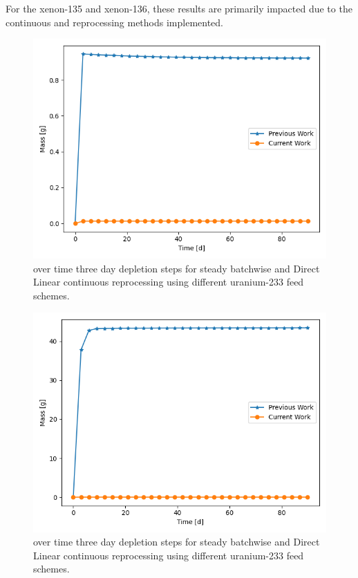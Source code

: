 For the xenon-135 and xenon-136, these results are primarily impacted due to the continuous and reprocessing methods implemented. 

\begin{figure}[H]
  \centering
  \includegraphics[scale=0.7]{images/prev-cur-xe135.png}
  \caption{ over time three day depletion steps for steady batchwise and Direct Linear continuous reprocessing using different uranium-233 feed schemes.}
   \label{fig:prev-cur-xe135-plot}
\end{figure}

\begin{figure}[H]
  \centering
  \includegraphics[scale=0.7]{images/prev-cur-xe136.png}
  \caption{ over time three day depletion steps for steady batchwise and Direct Linear continuous reprocessing using different uranium-233 feed schemes.}
   \label{fig:prev-cur-xe136-plot}
\end{figure}

